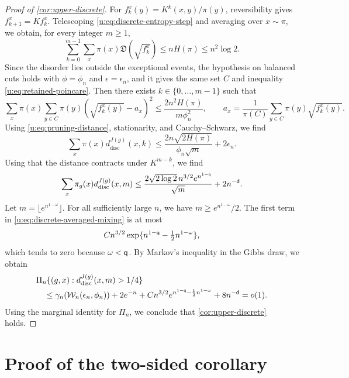 \begin{proof}[Proof of \cref{cor:upper-discrete}]
For $f_k^x(y)=K^k(x,y)/\pi(y)$, reversibility gives
$f_{k+1}^x=Kf_k^x$. Telescoping \eqref{u:eq:discrete-entropy-step}
and averaging over $x\sim\pi$, we obtain, for every integer $m\ge1$,
\begin{equation}\label{u:eq:discrete-dissipation}
 \sum_{k=0}^{m-1}\sum_x\pi(x)\mathfrak D(\sqrt{f_k^x})
 \le nH(\pi)\le n^2\log2.
\end{equation}
Since the disorder lies outside the exceptional events, the hypothesis
on balanced cuts holds with $\phi=\phi_n$ and $\epsilon=\epsilon_n$, and
it gives the same set $C$ and inequality
\eqref{u:eq:retained-poincare}. Then there exists
$k\in\{0,\ldots,m-1\}$ such that
\[
 \sum_x\pi(x)\sum_{y\in C}\pi(y)
       (\sqrt{f_k^x(y)}-a_x)^2
 \le\frac{2n^2H(\pi)}{m\phi_n^2},\qquad
 a_x=\frac1{\pi(C)}\sum_{y\in C}\pi(y)\sqrt{f_k^x(y)}.
\]
Using \eqref{u:eq:pruning-distance}, stationarity, and
Cauchy--Schwarz, we find
\[
 \sum_x\pi(x)d^{J(g)}_{\mathrm{disc}}(x,k)
 \le\frac{2n\sqrt{2H(\pi)}}{\phi_n\sqrt m}+2\epsilon_n.
\]
Using that the distance contracts under $K^{m-k}$, we find
\begin{equation}\label{u:eq:discrete-averaged-mixing}
 \sum_x\pi_g(x)d^{J(g)}_{\mathrm{disc}}(x,m)
 \le\frac{2\sqrt{2\log2}\,n^{3/2}e^{n^{1-\mathsf{q}}}}{\sqrt m}
       +2n^{-\mathsf{d}}.
\end{equation}
Let $m=\lfloor e^{n^{1-\omega}}\rfloor$. For all sufficiently large
$n$, we have $m\ge e^{n^{1-\omega}}/2$. The first term in
\eqref{u:eq:discrete-averaged-mixing} is at most
\[
 Cn^{3/2}\exp\{n^{1-\mathsf{q}}-\tfrac12n^{1-\omega}\},
\]
which tends to zero because $\omega<\mathsf{q}$. By Markov's inequality in
the Gibbs draw, we obtain
\begin{equation}\label{u:eq:discrete-bad-start}
 \begin{split}
 &\Pi_n\{(g,x):d^{J(g)}_{\mathrm{disc}}(x,m)>1/4\}\\
 &\quad\le\gamma_n(\mathcal W_n(\epsilon_n,\phi_n))+2e^{-n}
       +Cn^{3/2}e^{n^{1-\mathsf{q}}-\frac12n^{1-\omega}}
       +8n^{-\mathsf{d}}=o(1).
 \end{split}
\end{equation}
Using the marginal identity for $\Pi_n$, we conclude that \cref{cor:upper-discrete} holds.
\end{proof}

\section{Proof of the two-sided corollary}\label{u:sec:proof-two-sided}

